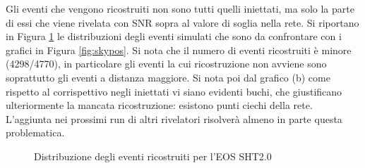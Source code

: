 Gli eventi che vengono ricostruiti non sono tutti quelli iniettati, ma solo la parte di essi che viene rivelata con SNR sopra al valore di soglia nella rete. Si riportano in Figura \ref{fig:skyposrec} le distribuzioni degli eventi simulati che sono da confrontare con i grafici in Figura \ref{fig:skypos}. Si nota che il numero di eventi ricostruiti è minore (4298/4770), in particolare gli eventi la cui ricostruzione non avviene sono soprattutto gli eventi a distanza maggiore. Si nota poi dal grafico (b) come rispetto al corrispettivo negli iniettati vi siano evidenti buchi, che giustificano ulteriormente la mancata ricostruzione: esistono punti ciechi della rete. L'aggiunta nei prossimi run di altri rivelatori risolverà almeno in parte questa problematica. 
\begin{figure}[ht]
	\vspace{-20pt}
	\centering
	\quad
	\vspace{-5pt}
	\caption{Distribuzione degli eventi ricostruiti per l'EOS SHT2.0}
	\label{fig:skyposrec}
	\vspace{-10pt}
\end{figure}
